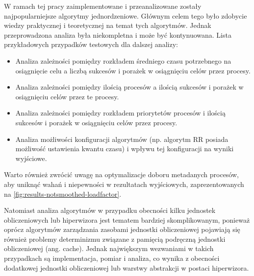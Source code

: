 \documentclass[../main]{subfiles}
\begin{document}
W ramach tej pracy zaimplementowane i przeanalizowane zostały najpopularniejsze algorytmy jednordzeniowe. Głównym celem tego było zdobycie wiedzy praktycznej i teoretycznej na temat tych algorytmów. Jednak przeprowadzona analiza była niekompletna i może być kontynuowana. Lista przykładowych przypadków testowych dla dalszej analizy:

\begin{itemize}
    \item Analiza zależności pomiędzy rozkładem średniego czasu potrzebnego na osiągnięcie celu a liczbą sukcesów i porażek w osiągnięciu celów przez procesy.
    \item Analiza zależności pomiędzy ilością procesów a ilością sukcesów i porażek w osiągnięciu celów przez te procesy.
    \item Analiza zależności pomiędzy rozkładem priorytetów procesów i ilością sukcesów i porażek w osiągnięciu celów przez procesy.
    \item Analiza możliwości konfiguracji algorytmów (np. algorytm RR posiada możliwość ustawienia kwantu czasu) i wpływu tej konfiguracji na wyniki wyjściowe.
\end{itemize}

Warto również zwrócić uwagę na optymalizacje doboru metadanych procesów, aby uniknąć wahań i niepewności w rezultatach wyjściowych, zaprezentowanych na \cref{fig:results-notsmoothed-loadfactor}.

Natomiast analiza algorytmów w przypadku obecności kilku jednostek obliczeniowych lub hiperwizora jest tematem bardziej skomplikowanym, ponieważ oprócz algorytmów zarządzania zasobami jednostki obliczeniowej pojawiają się również problemy determinizmu związane z pamięcią podręczną jednostki obliczeniowej (ang. cache). Jednak największym wezwaniami w takich przypadkach są implementacja, pomiar i analiza, co wynika z obecności dodatkowej jednostki obliczeniowej lub warstwy abstrakcji w postaci hiperwizora.
\end{document}
